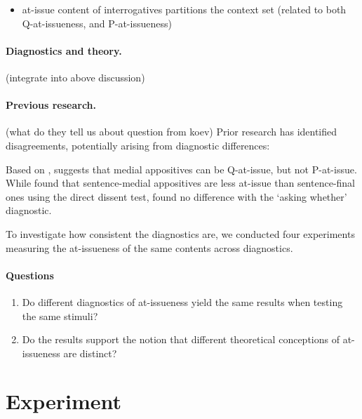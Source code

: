 \documentclass[12pt]{article}
\begin{document}
    \citealt{tonhauser_how_2018}
    \begin{itemize}
      \item at-issue content of interrogatives partitions the context set (related to both Q-at-issueness, and P-at-issueness)
    \end{itemize}

  \paragraph{Diagnostics and theory.} (integrate into above discussion)
    

  \paragraph{Previous research.} (what do they tell us about question from koev)
    Prior research has identified disagreements, potentially arising from  diagnostic differences:

    Based on , \citealt{koev_notions_2018} suggests that medial appositives can be Q-at-issue, but not P-at-issue. While \citealt{syrett_experimental_2015} found that sentence-medial appositives are less at-issue than sentence-final ones using the direct dissent test, \citealt{drozdov_projection_2024} found no difference with the `asking whether' diagnostic.

    To investigate how consistent the diagnostics are, we conducted four experiments measuring the at-issueness of the same contents across diagnostics.

  \paragraph{Questions} %
    \begin{enumerate}
      \item Do different diagnostics of at-issueness yield the same results when testing the same stimuli?
      \item Do the results support the notion that different theoretical conceptions of at-issueness are distinct?
    \end{enumerate}

\section{Experiment}
  
\end{document}
